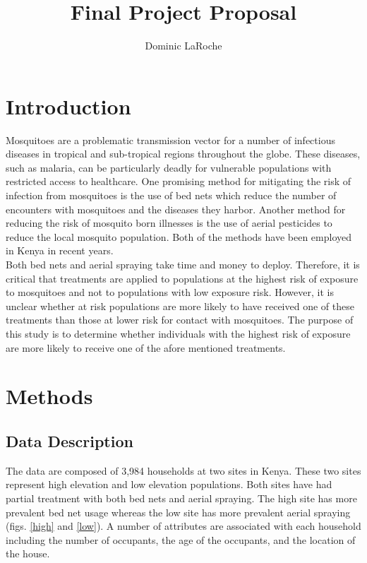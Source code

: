 \documentclass{article}\usepackage[]{graphicx}\usepackage[]{color}
\title{Final Project Proposal}
\author{Dominic LaRoche}
\begin{document}
\maketitle

\section{Introduction}
Mosquitoes are a problematic transmission vector for a number of infectious diseases in tropical and sub-tropical regions throughout the globe.  These diseases, such as malaria, can be particularly deadly for vulnerable populations with restricted access to healthcare.  One promising method for mitigating the risk of infection from mosquitoes is the use of bed nets which reduce the number of encounters with mosquitoes and the diseases they harbor.  Another method for reducing the risk of mosquito born illnesses is the use of aerial pesticides to reduce the local mosquito population. Both of the methods have been employed in Kenya in recent years.  \\

Both bed nets and aerial spraying take time and money to deploy.  Therefore, it is critical that treatments are applied to populations at the highest risk of exposure to mosquitoes and not to populations with low exposure risk.  However, it is unclear whether at risk populations are more likely to have received one of these treatments than those at lower risk for contact with mosquitoes.  The purpose of this study is to determine whether individuals with the highest risk of exposure are more likely to receive one of the  afore mentioned treatments.\\



\section{Methods}
\subsection{Data Description}
The data are composed of 3,984 households at two sites in Kenya.  These two sites represent high elevation and low elevation populations.  Both sites have had partial treatment with both bed nets and aerial spraying.  The high site has more prevalent bed net usage whereas the low site has more prevalent aerial spraying (figs. \ref{high} and \ref{low}).  A number of attributes are associated with each household including the number of occupants, the age of the occupants, and the location of the house.\\
\end{document}

